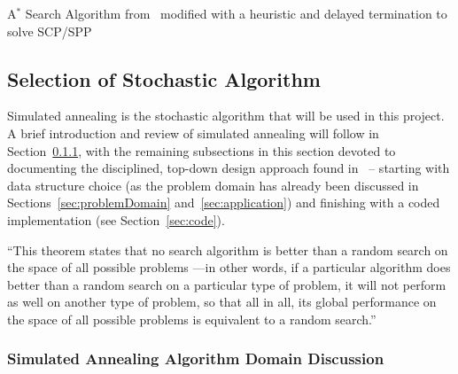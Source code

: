 \documentclass[conference]{IEEEtran}
\begin{document}
\begin{algorithm}[ht!]
    \caption{A$^*$ Search Algorithm from~\cite{pearl1984} modified with a
    heuristic and delayed termination to solve SCP/SPP}
    \label{alg:astar}
\end{algorithm}


\subsection{Selection of Stochastic Algorithm}

Simulated annealing is the stochastic algorithm that will be used in this
project. A brief introduction and review of simulated annealing will follow in
Section~\ref{sec:SAD}, with the remaining subsections in this section devoted
to documenting the disciplined, top-down design approach found
in~\cite{lamontMIS, lamontDesign, lamontSCP} -- starting with data structure
choice (as the problem domain has already been discussed in
Sections~\ref{sec:problemDomain} and~\ref{sec:application}) and finishing with
a coded implementation (see Section~\ref{sec:code}).

``This theorem states that no search algorithm is better than a random search
on the space of all possible problems —in other words, if a particular
algorithm does better than a random search on a particular type of problem, it
will not perform as well on another type of problem, so that all in all, its
global performance on the space of all possible problems is equivalent to a
random search.''~\cite{collet2007, wiki:nfl}

\subsubsection{Simulated Annealing Algorithm Domain Discussion} \label{sec:SAD}
\end{document}
